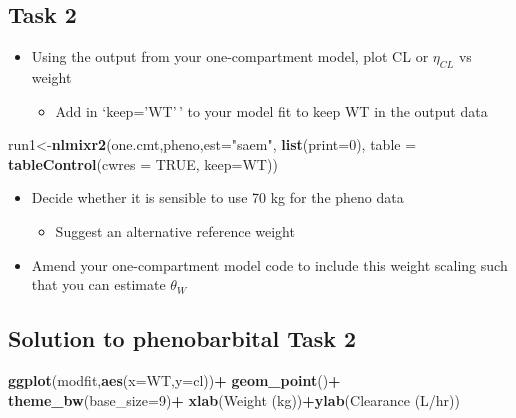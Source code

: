 \documentclass[
]{article}
\newenvironment{Shaded}{\begin{snugshade}}{\end{snugshade}}
\newcommand{\AttributeTok}[1]{\textcolor[rgb]{0.13,0.29,0.53}{#1}}
\newcommand{\ConstantTok}[1]{\textcolor[rgb]{0.56,0.35,0.01}{#1}}
\newcommand{\DecValTok}[1]{\textcolor[rgb]{0.00,0.00,0.81}{#1}}
\newcommand{\FunctionTok}[1]{\textcolor[rgb]{0.13,0.29,0.53}{\textbf{#1}}}
\newcommand{\NormalTok}[1]{#1}
\newcommand{\OtherTok}[1]{\textcolor[rgb]{0.56,0.35,0.01}{#1}}
\newcommand{\SpecialCharTok}[1]{\textcolor[rgb]{0.81,0.36,0.00}{\textbf{#1}}}
\newcommand{\StringTok}[1]{\textcolor[rgb]{0.31,0.60,0.02}{#1}}
\providecommand{\tightlist}{%
  \setlength{\itemsep}{0pt}\setlength{\parskip}{0pt}}
\begin{document}
\subsection{Task 2}\label{task-2}

\begin{itemize}
\tightlist
\item
  Using the output from your one-compartment model, plot CL or \(\eta_{CL}\) vs weight

  \begin{itemize}
  \tightlist
  \item
    Add in `keep='WT'\,' to your model fit to keep WT in the output data
  \end{itemize}
\end{itemize}

\begin{Shaded}
\begin{Highlighting}[]
\NormalTok{run1}\OtherTok{\textless{}{-}}\FunctionTok{nlmixr2}\NormalTok{(one.cmt,pheno,}\AttributeTok{est=}\StringTok{"saem"}\NormalTok{, }\FunctionTok{list}\NormalTok{(}\AttributeTok{print=}\DecValTok{0}\NormalTok{),}
              \AttributeTok{table =} \FunctionTok{tableControl}\NormalTok{(}\AttributeTok{cwres =} \ConstantTok{TRUE}\NormalTok{, }\AttributeTok{keep=}\StringTok{\textquotesingle{}WT\textquotesingle{}}\NormalTok{))}
\end{Highlighting}
\end{Shaded}

\begin{itemize}
\tightlist
\item
  Decide whether it is sensible to use 70 kg for the pheno data

  \begin{itemize}
  \tightlist
  \item
    Suggest an alternative reference weight
  \end{itemize}
\item
  Amend your one-compartment model code to include this weight scaling such that you can estimate \({\theta_{W}}\)
\end{itemize}

\newpage

\subsection{Solution to phenobarbital Task 2}\label{solution-to-phenobarbital-task-2}

\begin{Shaded}
\begin{Highlighting}[]
\FunctionTok{ggplot}\NormalTok{(modfit,}\FunctionTok{aes}\NormalTok{(}\AttributeTok{x=}\NormalTok{WT,}\AttributeTok{y=}\NormalTok{cl))}\SpecialCharTok{+}
  \FunctionTok{geom\_point}\NormalTok{()}\SpecialCharTok{+}
  \FunctionTok{theme\_bw}\NormalTok{(}\AttributeTok{base\_size=}\DecValTok{9}\NormalTok{)}\SpecialCharTok{+}
  \FunctionTok{xlab}\NormalTok{(}\StringTok{\textquotesingle{}Weight (kg)\textquotesingle{}}\NormalTok{)}\SpecialCharTok{+}\FunctionTok{ylab}\NormalTok{(}\StringTok{\textquotesingle{}Clearance (L/hr)\textquotesingle{}}\NormalTok{)}
\end{Highlighting}
\end{Shaded}
\end{document}
